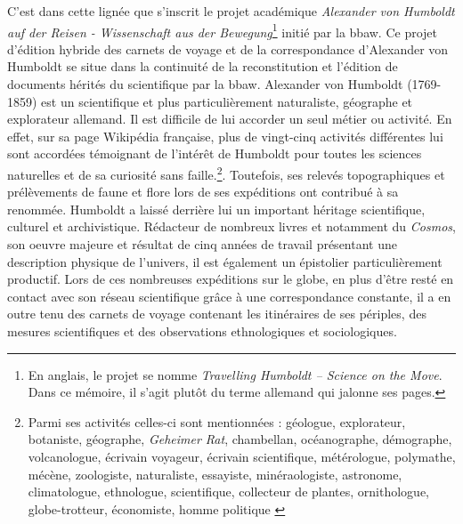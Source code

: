 \documentclass[a4paper, 12pt, twoside]{book}
\begin{document}
C'est dans cette lignée que s'inscrit le projet académique \textit{Alexander von Humboldt auf der Reisen - Wissenschaft aus der Bewegung}\footnote{En anglais, le projet se nomme \textit{Travelling Humboldt – Science on the Move}. Dans ce mémoire, il s'agit plutôt du terme allemand qui jalonne ses pages.} initié par la \gls{bbaw}. Ce projet d'édition hybride des carnets de voyage et de la correspondance d'Alexander von Humboldt se situe dans la continuité de la reconstitution et l'édition de documents hérités du scientifique par la \gls{bbaw}. Alexander von Humboldt (1769-1859) est un scientifique et plus particulièrement naturaliste, géographe et explorateur allemand. Il est difficile de lui accorder un seul métier ou activité. En effet, sur sa page Wikipédia française, plus de vingt-cinq activités différentes lui sont accordées témoignant de l'intérêt de Humboldt pour toutes les sciences naturelles et de sa curiosité sans faille.\footnote{Parmi ses activités celles-ci sont mentionnées : géologue, explorateur, botaniste, géographe, \textit{Geheimer Rat}, chambellan, océanographe, démographe, volcanologue, écrivain voyageur, écrivain scientifique, métérologue, polymathe, mécène, zoologiste, naturaliste, essayiste, minéraologiste, astronome, climatologue, ethnologue, scientifique, collecteur de plantes, ornithologue, globe-trotteur, économiste, homme politique \cite{noauthor_alexander_2021}}.  Toutefois, ses relevés topographiques et prélèvements de faune et flore lors de ses expéditions ont contribué à sa renommée. Humboldt a laissé derrière lui un important héritage scientifique, culturel et archivistique. Rédacteur de nombreux livres et notamment du \textit{Cosmos}, son oeuvre majeure et résultat de cinq années de travail présentant une description physique de l'univers, il est également un épistolier particulièrement productif. Lors de ces nombreuses expéditions sur le globe, en plus d'être resté en contact avec son réseau scientifique grâce à une correspondance constante, il a en outre tenu des carnets de voyage contenant les itinéraires de ses périples, des mesures scientifiques et des observations ethnologiques et sociologiques.
\end{document}
